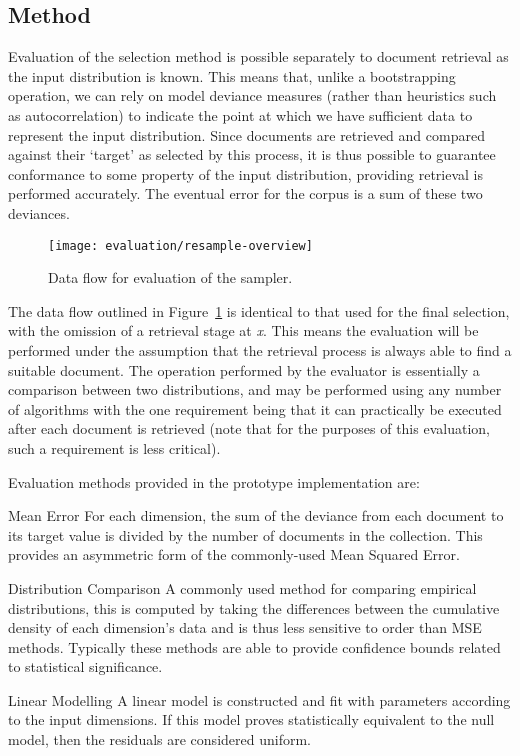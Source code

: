 \subsection{Method}
Evaluation of the selection method is possible separately to document retrieval as the input distribution is known.  This means that, unlike a bootstrapping operation, we can rely on model deviance measures (rather than heuristics such as autocorrelation) to indicate the point at which we have sufficient data to represent the input distribution.  Since documents are retrieved and compared against their `target' as selected by this process, it is thus possible to guarantee conformance to some property of the input distribution, providing retrieval is performed accurately.  The eventual error for the corpus is a sum of these two deviances.


\begin{figure}[ht]
    \centering
    \texttt{[image: evaluation/resample-overview]}
    \caption{Data flow for evaluation of the sampler.}
    \label{fig:evaluation:resampling:overview}
\end{figure}


The data flow outlined in Figure~\ref{fig:evaluation:resampling:overview} is identical to that used for the final selection, with the omission of a retrieval stage at \textsl{\color{red} x}.  This means the evaluation will be performed under the assumption that the retrieval process is always able to find a suitable document.  The operation performed by the evaluator is essentially a comparison between two distributions, and may be performed using any number of algorithms with the one requirement being that it can practically be executed after each document is retrieved (note that for the purposes of this evaluation, such a requirement is less critical).

Evaluation methods provided in the prototype implementation are:

\begin{itemizeTitle}

    \item[Mean Error] For each dimension, the sum of the deviance from each document to its target value is divided by the number of documents in the collection.  This provides an asymmetric form of the commonly-used Mean Squared Error.
    \item[Distribution Comparison] A commonly used method for comparing empirical distributions, this is computed by taking the differences between the cumulative density of each dimension's data and is thus less sensitive to order than MSE methods.  Typically these methods are able to provide confidence bounds related to statistical significance.
    \item[Linear Modelling] A linear model is constructed and fit with parameters according to the input dimensions.  If this model proves statistically equivalent to the null model, then the residuals are considered uniform.

\end{itemizeTitle}


